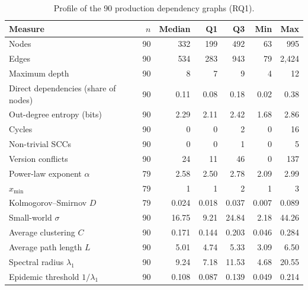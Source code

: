 \begin{table}[!htpb]
    \centering
    \small
    \caption{Profile of the 90 production dependency graphs (RQ1).}
    \label{tab:eval-rq1}
    \begin{tabular}{lrrrrrr}
        \toprule
        \textbf{Measure} & \(n\) & \textbf{Median} & \textbf{Q1} & \textbf{Q3} & \textbf{Min} & \textbf{Max} \\
        \midrule
        Nodes & 90 & 332 & 199 & 492 & 63 & 995 \\
        Edges & 90 & 534 & 283 & 943 & 79 & 2{,}424 \\
        Maximum depth & 90 & 8 & 7 & 9 & 4 & 12 \\
        Direct dependencies (share of nodes) & 90 & 0.11 & 0.08 & 0.18 & 0.02 & 0.38 \\
        Out-degree entropy (bits) & 90 & 2.29 & 2.11 & 2.42 & 1.68 & 2.86 \\
        Cycles & 90 & 0 & 0 & 2 & 0 & 16 \\
        Non-trivial SCCs & 90 & 0 & 0 & 1 & 0 & 5 \\
        Version conflicts & 90 & 24 & 11 & 46 & 0 & 137 \\
        Power-law exponent \(\alpha\) & 79 & 2.58 & 2.50 & 2.78 & 2.09 & 2.99 \\
        \(x_{\min}\) & 79 & 1 & 1 & 2 & 1 & 3 \\
        Kolmogorov--Smirnov \(D\) & 79 & 0.024 & 0.018 & 0.037 & 0.007 & 0.089 \\
        Small-world \(\sigma\) & 90 & 16.75 & 9.21 & 24.84 & 2.18 & 44.26 \\
        Average clustering \(C\) & 90 & 0.171 & 0.144 & 0.203 & 0.046 & 0.284 \\
        Average path length \(L\) & 90 & 5.01 & 4.74 & 5.33 & 3.09 & 6.50 \\
        Spectral radius \(\lambda_1\) & 90 & 9.24 & 7.18 & 11.53 & 4.68 & 20.55 \\
        Epidemic threshold \(1/\lambda_1\) & 90 & 0.108 & 0.087 & 0.139 & 0.049 & 0.214 \\
        \bottomrule
    \end{tabular}
\end{table}
